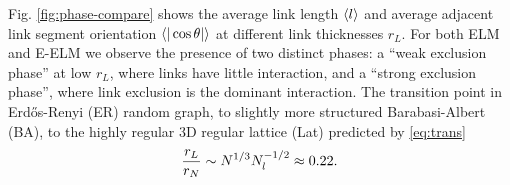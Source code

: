 \documentclass[nofootinbib,preprint,floatfix,endfloats]{revtex4} %
\begin{document}


Fig. \ref{fig:phase-compare} shows the average link length $\left<l\right>$ and average adjacent link segment orientation $\be{|\cos\theta|}$ at different link thicknesses $r_L$. 
For both ELM and E-ELM we observe the presence of two distinct phases: a ``weak exclusion phase'' at low $r_L$, where links have little interaction, and a ``strong exclusion phase'', where link exclusion is the dominant interaction. 
The transition point in Erdős-Renyi (ER) random graph, to slightly more structured Barabasi-Albert (BA), 
to the highly regular 3D regular lattice (Lat) predicted by \eqref{eq:trans} 
\begin{equation}
    {r_L\over r_N} \sim N^{1/3} N_l^{-1/2}\approx 0.22
    \label{eq:22}.
\end{equation}
\end{document}
